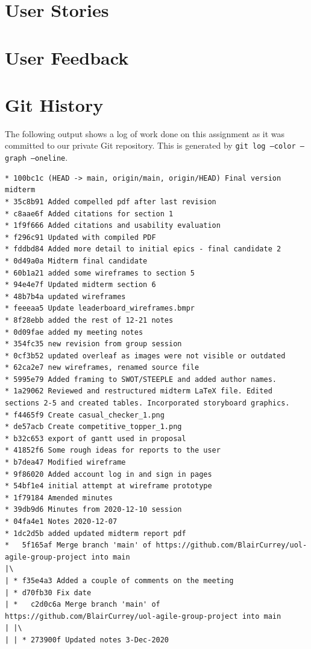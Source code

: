 \section{User Stories}

\section{User Feedback}


\section{Git History}
The following output shows a log of work done on this assignment as it was committed to our private Git repository. This is generated by \texttt{git log --color --graph --oneline}.

\begin{verbatim}
* 100bc1c (HEAD -> main, origin/main, origin/HEAD) Final version midterm
* 35c8b91 Added compelled pdf after last revision
* c8aae6f Added citations for section 1
* 1f9f666 Added citations and usability evaluation
* f296c91 Updated with compiled PDF
* fddbd84 Added more detail to initial epics - final candidate 2
* 0d49a0a Midterm final candidate
* 60b1a21 added some wireframes to section 5
* 94e4e7f Updated midterm section 6
* 48b7b4a updated wireframes
* feeeaa5 Update leaderboard_wireframes.bmpr
* 8f28ebb added the rest of 12-21 notes
* 0d09fae added my meeting notes
* 354fc35 new revision from group session
* 0cf3b52 updated overleaf as images were not visible or outdated
* 62ca2e7 new wireframes, renamed source file
* 5995e79 Added framing to SWOT/STEEPLE and added author names.
* 1a29062 Reviewed and restructured midterm LaTeX file. Edited sections 2-5 and created tables. Incorporated storyboard graphics.
* f4465f9 Create casual_checker_1.png
* de57acb Create competitive_topper_1.png
* b32c653 export of gantt used in proposal
* 41852f6 Some rough ideas for reports to the user
* b7dea47 Modified wireframe
* 9f86020 Added account log in and sign in pages
* 54bf1e4 initial attempt at wireframe prototype
* 1f79184 Amended minutes
* 39db9d6 Minutes from 2020-12-10 session
* 04fa4e1 Notes 2020-12-07
* 1dc2d5b added updated midterm report pdf
*   5f165af Merge branch 'main' of https://github.com/BlairCurrey/uol-agile-group-project into main
|\
| * f35e4a3 Added a couple of comments on the meeting
| * d70fb30 Fix date
| *   c2d0c6a Merge branch 'main' of https://github.com/BlairCurrey/uol-agile-group-project into main
| |\
| | * 273900f Updated notes 3-Dec-2020

\end{verbatim}
